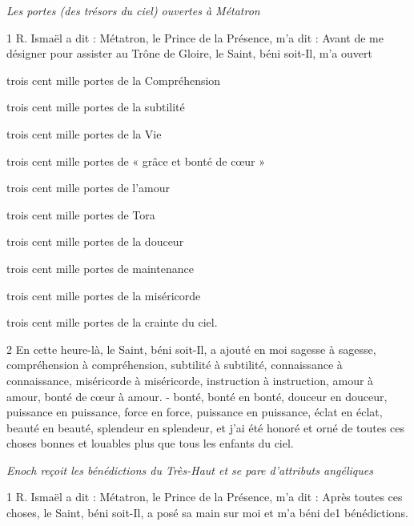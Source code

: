 
\par \textit{Les portes (des trésors du ciel) ouvertes à Métatron}

\par 1 R. Ismaël a dit : Métatron, le Prince de la Présence, m'a dit : Avant de me désigner pour assister au Trône de Gloire, le Saint, béni soit-Il, m'a ouvert

\par trois cent mille portes de la Compréhension

\par trois cent mille portes de la subtilité

\par trois cent mille portes de la Vie

\par trois cent mille portes de « grâce et bonté de cœur »

\par trois cent mille portes de l'amour

\par trois cent mille portes de Tora

\par trois cent mille portes de la douceur

\par trois cent mille portes de maintenance

\par trois cent mille portes de la miséricorde

\par trois cent mille portes de la crainte du ciel.

\par 2 En cette heure-là, le Saint, béni soit-Il, a ajouté en moi sagesse à sagesse, compréhension à compréhension, subtilité à subtilité, connaissance à connaissance, miséricorde à miséricorde, instruction à instruction, amour à amour, bonté de cœur à amour. - bonté, bonté en bonté, douceur en douceur, puissance en puissance, force en force, puissance en puissance, éclat en éclat, beauté en beauté, splendeur en splendeur, et j'ai été honoré et orné de toutes ces choses bonnes et louables plus que tous les enfants du ciel.



\par \textit{Enoch reçoit les bénédictions du Très-Haut et se pare d'attributs angéliques}

\par 1 R. Ismaël a dit : Métatron, le Prince de la Présence, m'a dit : Après toutes ces choses, le Saint, béni soit-Il, a posé sa main sur moi et m'a béni de1 bénédictions.

